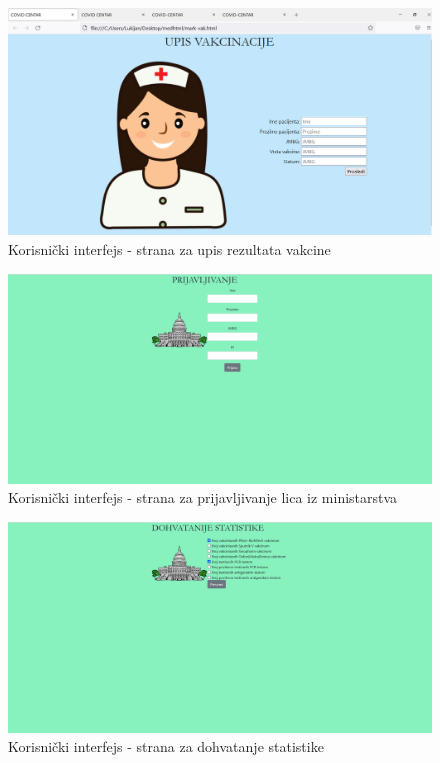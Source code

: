 \documentclass[titlepage]{article}
\begin{document}
\begin{figure}[H]
\centering
\includegraphics[scale=0.43]{upisvakcine}
\caption{Korisni\v{c}ki interfejs - strana za upis rezultata vakcine}
\label{slk:komponente}
\end{figure}

\begin{figure}[H]
\centering
\includegraphics[scale=0.3]{ministarstvo-prijava}
\caption{Korisni\v{c}ki interfejs - strana za prijavljivanje lica iz ministarstva}
\label{slk:komponente}
\end{figure}

\begin{figure}[H]
\centering
\includegraphics[scale=0.3]{ministarstvo-dohvatanje}
\caption{Korisni\v{c}ki interfejs - strana za dohvatanje statistike}
\label{slk:komponente}
\end{figure}
\end{document}
